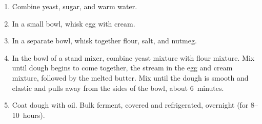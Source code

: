 

\begin{ingredients}
\end{ingredients}

\begin{recipe}
  \begin{enumerate}

  \item Combine yeast, sugar, and warm water.

  \item In a small bowl, whisk egg with cream.

  \item In a separate bowl, whisk together flour, salt, and nutmeg.

  \item In the bowl of a stand mixer, combine yeast mixture with flour
    mixture.  Mix until dough begins to come together, the stream in
    the egg and cream mixture, followed by the melted butter.  Mix
    until the dough is smooth and elastic and pulls away from the
    sides of the bowl, about 6~minutes.

  \item Coat dough with oil.  Bulk ferment, covered and refrigerated,
    overnight (for 8--10~hours).

  \end{enumerate}
\end{recipe}



\begin{ingredients}
\end{ingredients}

